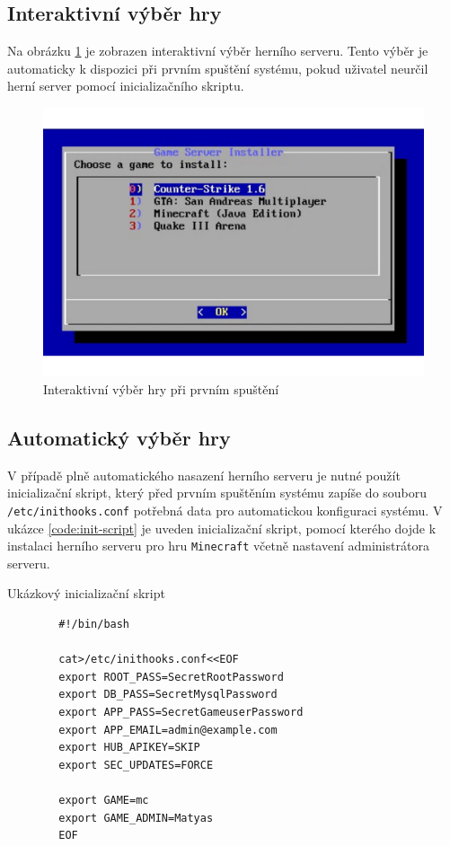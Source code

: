 \subsection{Interaktivní výběr hry}

Na obrázku \ref{fig:game-selection} je zobrazen interaktivní výběr herního serveru. Tento výběr je automaticky
k dispozici při prvním spuštění systému, pokud uživatel neurčil herní server pomocí inicializačního skriptu.

\begin{figure}[h]
    \centering
    \includegraphics[width=1\linewidth]{chapters/images/game-selection.pdf}
    \caption{Interaktivní výběr hry při prvním spuštění}
    \label{fig:game-selection}
\end{figure}

\subsection{Automatický výběr hry}

V případě plně automatického nasazení herního serveru je nutné použít inicializační skript, který před prvním spuštěním systému
zapíše do souboru \texttt{/etc/inithooks.conf} potřebná data pro automatickou konfiguraci systému.
V ukázce \ref{code:init-script} je uveden inicializační skript, pomocí kterého dojde k instalaci herního serveru pro hru \texttt{Minecraft}
včetně nastavení administrátora serveru.

\begin{listing}[h]
    \caption{Ukázkový inicializační skript}
    \label{code:init-script}
    \begin{verbatim}
        #!/bin/bash

        cat>/etc/inithooks.conf<<EOF
        export ROOT_PASS=SecretRootPassword
        export DB_PASS=SecretMysqlPassword
        export APP_PASS=SecretGameuserPassword
        export APP_EMAIL=admin@example.com
        export HUB_APIKEY=SKIP
        export SEC_UPDATES=FORCE
        
        export GAME=mc
        export GAME_ADMIN=Matyas
        EOF
    \end{verbatim}
\end{listing}

